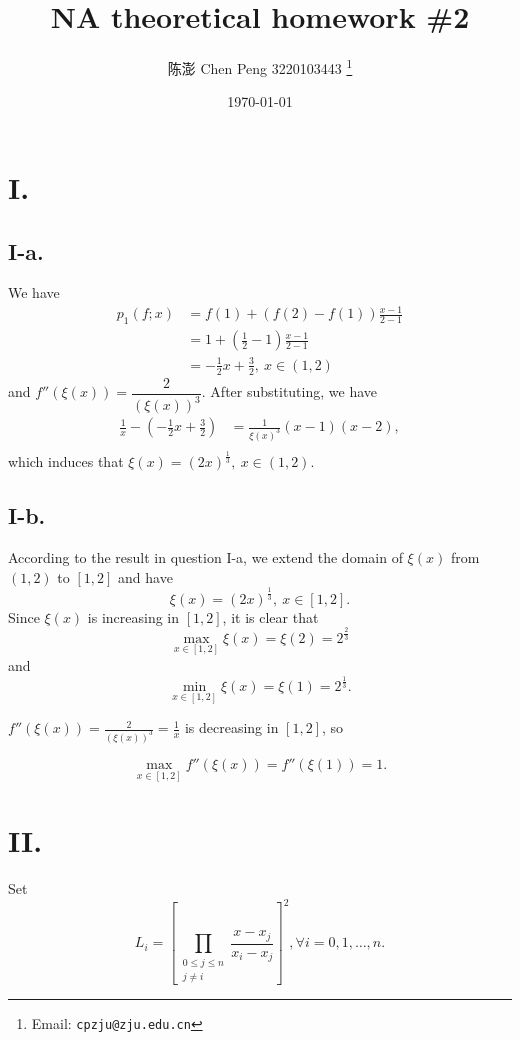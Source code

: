 \documentclass[a4paper]{article}
\begin{document}
\title{NA theoretical homework \#2}

\author{陈澎 Chen Peng 3220103443
  \thanks{Email: \texttt{cpzju@zju.edu.cn}}}


\date{\today}

\maketitle

\section  *{I.}
\subsection*{I-a.}
We have
$$
\begin{aligned}
    p_1(f; x) &= f(1) + (f(2) - f(1)) \frac{x - 1}{2 - 1}   \\
    &= 1 + (\frac{1}{2} - 1) \frac{x - 1}{2 - 1}    \\
    &= -\frac{1}{2}x + \frac{3}{2}, \ x\in(1,2)
\end{aligned}
$$
and $f''(\xi(x)) = \dfrac{2}{(\xi(x))^3}$. After substituting, we have
$$
\begin{aligned}
    \frac{1}{x} - (-\frac{1}{2}x + \frac{3}{2}) &=\frac{1}{\xi(x)^3} (x - 1) (x - 2),    \\
\end{aligned}
$$
which induces that $\xi(x)=(2x)^{\frac{1}{3}},\  x\in(1,2).$

\subsection*{I-b.}
According to the result in question I-a, we extend the domain of $\xi(x)$ from $(1,2)$ to $[1,2]$ and have
$$
  \xi(x)=(2x)^{\frac{1}{3}},\  x\in[1,2].
$$ 
Since $\xi(x)$ is increasing in $[1, 2]$, it is clear that $$\max_{x \in [1, 2]}\xi(x)=\xi(2)=2^\frac{2}{3}$$ and $$\min_{x \in [1, 2]}\xi(x)=\xi(1)=2^\frac{1}{3}.$$

$f''(\xi(x)) = \frac{2}{(\xi(x))^3} = \frac{1}{x}$ is decreasing in $[1, 2]$, so

$$
\max_{x \in [1, 2]} f''(\xi(x)) = f''(\xi(1)) = 1.
$$


\section*{II.}
Set
$$
L_{i} = \left[\prod_{\substack{ 0 \leq j \leq n \\ j \neq i}} \frac{x-x_j}{x_i-x_j} \right]^2, \forall i = 0, 1, \dots, n.
$$
\end{document}
